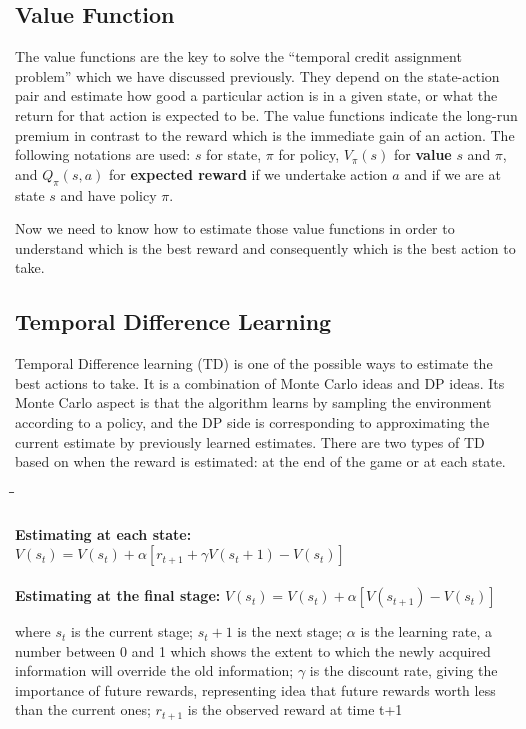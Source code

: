 \documentclass[fleqn]{article}
\begin{document}
\subsection{Value Function}
The value functions are the key to solve the “temporal credit assignment problem” which we have discussed previously. They depend on the state-action pair and estimate how good a particular action is in a given state, or what the return for that action is expected to be. The value functions indicate the long-run premium in contrast to the reward which is the immediate gain of an action. The following notations are used: $s$ for state, $\pi$ for policy, $V_\pi(s)$ for  \textbf{value} $s$ and $\pi$, and $Q_\pi(s,a)$ for  \textbf{expected reward} if we undertake action $a$ and if we are at state $s$ and have policy $\pi$.  

Now we need to know how to estimate those value functions in order to understand which is the best reward and consequently which is the best action to take.  

\subsection{Temporal Difference Learning}
Temporal Difference learning (TD) is one of the possible ways to estimate the best actions to take. It is a combination of Monte Carlo ideas and DP ideas. Its Monte Carlo aspect is that the algorithm learns by sampling the environment according to a policy, and the DP side is corresponding to approximating the current estimate by previously learned estimates. There are two types of TD based on when the reward is estimated: at the end of the game or at each state. 

 \begin{tabbing}
 	\text{} \hspace{5.5cm} \= \= \= \text{}   \\
 	\\
 	\textbf{Estimating at each state:} 	\>	\>  \>   $V(s_t) = V(s_t) + \alpha [r_{t+1} +\gamma V(s_t+1) -V(s_t)]$ \\
 	\\
\textbf{Estimating at the final stage:} 	\>	\>  \> $V(s_t) = V(s_t) + \alpha [V(s_{t+1}) - V(s_t)]$    \\ 
 \end{tabbing}

where $s_t$ is the current stage;   
$s_t+1$ is the next stage;   
$\alpha$ is the learning rate, a number between 0 and 1 which shows the extent to which the newly acquired information will override the old information;  
$\gamma$ is the discount rate, giving the importance of future rewards, representing idea that future rewards worth less than the current ones;  
$r_{t+1}$ is the observed reward at time t+1
\end{document}
